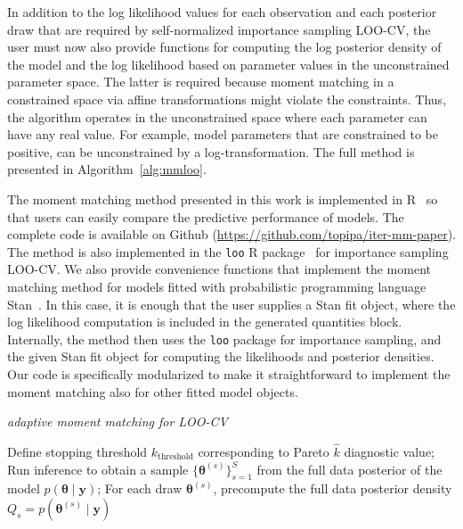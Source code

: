 \documentclass[12pt]{article}
\begin{document}
\begin{appendices}
In addition to the log likelihood values for each observation and
each posterior draw that are required by self-normalized importance sampling LOO-CV,
the user must now also provide functions for computing the log posterior density of the model
and the log likelihood based on parameter values in the unconstrained parameter space. The latter is required because moment matching in a constrained space via affine transformations might violate the constraints. Thus, the algorithm operates in the unconstrained space where each parameter can have any real value.
For example, model parameters that are constrained to be positive, can be unconstrained by a log-transformation.
The full method is presented in Algorithm~\ref{alg:mmloo}.









The moment matching method presented in this work is implemented in R~\citep{rlang}
so that users can easily compare the predictive performance
of models.
The complete code
is available on Github (\url{https://github.com/topipa/iter-mm-paper}).
The method is also implemented in the \texttt{loo} R package~\citep{loo}
for importance sampling LOO-CV.
We also provide convenience functions that implement the moment matching method 
for models fitted with probabilistic programming language 
Stan~\citep{carpenter2017stan}. In this case, it is enough that
the user supplies a Stan fit object, where the log likelihood
computation is included in the generated quantities block.
Internally, the method then uses the \texttt{loo} package for importance sampling,
and the given Stan fit object for computing the likelihoods
and posterior densities. Our code is specifically modularized to make it 
straightforward to implement the moment matching also 
for other fitted model objects.





\begin{algorithm*}[htb]
	\caption{\em adaptive moment matching for LOO-CV}\label{alg:mmloo}
	\begin{algorithmic}[1]
	    \STATE Define stopping threshold $k_{\text{threshold}}$ corresponding to Pareto $\hat{k}$
	    diagnostic value;
		\STATE Run inference to obtain a sample $\{ \boldsymbol{\theta}^{(s)} \}_{s = 1}^S$ from the full data posterior of the model $p (\boldsymbol{\theta} \mid \mathbf{y})$;
		\STATE For each draw $\boldsymbol{\theta}^{(s)}$, precompute the full data posterior density $Q_s = p (\boldsymbol{\theta}^{(s)}\mid\mathbf{y})$
		 

\end{algorithmic}
\end{algorithm*}
\end{appendices}
\end{document}
